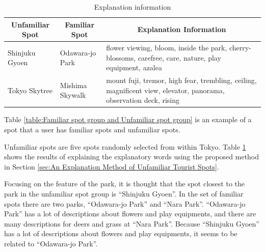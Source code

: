 \documentclass[journal]{IAENGtran}
\begin{document}
\begin{table}[t]
  \caption{Explanation information}
  \label{table:Explanation information}
  \centering
  \begin{tabular}{l|l|l}
  \hline
  \multicolumn{1}{c|}{Unfamiliar Spot} & \multicolumn{1}{c|}{Familiar Spot} & \multicolumn{1}{c}{Explanation Information}                     \\ \hline
  Shinjuku Gyoen                      & Odawara-jo Park                         & flower viewing, bloom, inside the park, cherry-blossoms, carefree, care, nature, play equipment, azalea          \\ \hline
  Tokyo Skytree                     & Mishima Skywalk                    & mount fuji, tremor, high fear, trembling, ceiling, magnificent view, elevator, panorama, observation deck, rising
 \\ \hline
  \end{tabular}
\end{table}

Table \ref{table:Familiar spot group and Unfamiliar spot group} is an example of a spot that a user has familiar spots and unfamiliar spots.

Unfamiliar spots are five spots randomly selected from within Tokyo.
Table \ref{table:Explanation information} shows the results of explaining the explanatory words using the proposed method in Section \ref{sec:An Explanation Method of Unfamiliar Tourist Spots}.

Focusing on the feature of the park, it is thought that the spot closest to the park in the unfamiliar spot group is ``Shinjuku Gyoen''.
In the set of familiar spots there are two parks, ``Odawara-jo Park'' and ``Nara Park''.
``Odawara-jo Park'' has a lot of descriptions about flowers and play equipments, and there are many descriptions for deers and grass at ``Nara Park''.
Because ``Shinjuku Gyoen'' has a lot of descriptions about flowers and play equipments, it seems to be related to ``Odawara-jo Park''.
\end{document}
